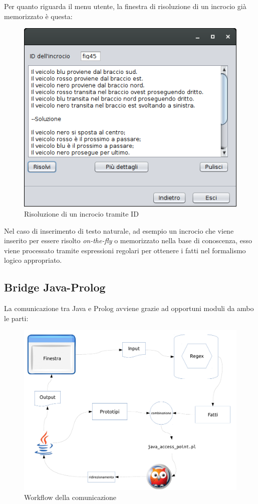 \clearpage
Per quanto riguarda il menu utente, la finestra di risoluzione di un incrocio già memorizzato è questa:
\begin{figure}[!htb]
	\centering
	\includegraphics[width=.5\textwidth]{images/gui/solve_gui}
	\caption{Risoluzione di un incrocio tramite ID}
\end{figure}

Nel caso di inserimento di testo naturale, ad esempio un incrocio che viene inserito per essere risolto \textit{on-the-fly} o memorizzato nella base di conoscenza, esso viene processato tramite espressioni regolari per ottenere i fatti nel formalismo logico appropriato.

\clearpage

\subsection{Bridge Java-Prolog}

La comunicazione tra Java e Prolog avviene grazie ad opportuni moduli da ambo le parti:

\begin{figure}[!htb]
	\centering
	\includegraphics[width=\textwidth]{images/jap}
	\caption{Workflow della comunicazione}
\end{figure}

